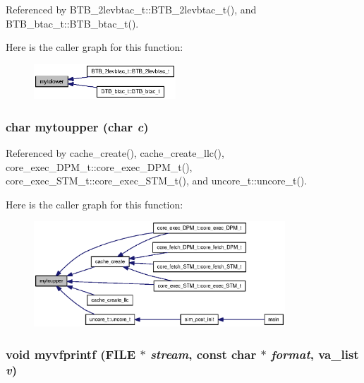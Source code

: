 Referenced by BTB\_\-2levbtac\_\-t::BTB\_\-2levbtac\_\-t(), and BTB\_\-btac\_\-t::BTB\_\-btac\_\-t().

Here is the caller graph for this function:\nopagebreak
\begin{figure}[H]
\begin{center}
\leavevmode
\includegraphics[width=151pt]{misc_8h_a400d7148b23b4458a7dd87fc590d780_icgraph}
\end{center}
\end{figure}
\subsubsection[{mytoupper}]{\setlength{\rightskip}{0pt plus 5cm}char mytoupper (char {\em c})}\label{misc_8h_e9332e6ace7e2352b856c2a76bd9ef43}




Referenced by cache\_\-create(), cache\_\-create\_\-llc(), core\_\-exec\_\-DPM\_\-t::core\_\-exec\_\-DPM\_\-t(), core\_\-exec\_\-STM\_\-t::core\_\-exec\_\-STM\_\-t(), and uncore\_\-t::uncore\_\-t().

Here is the caller graph for this function:\nopagebreak
\begin{figure}[H]
\begin{center}
\leavevmode
\includegraphics[width=267pt]{misc_8h_e9332e6ace7e2352b856c2a76bd9ef43_icgraph}
\end{center}
\end{figure}
\subsubsection[{myvfprintf}]{\setlength{\rightskip}{0pt plus 5cm}void myvfprintf (FILE $\ast$ {\em stream}, \/  const char $\ast$ {\em format}, \/  va\_\-list {\em v})}\label{misc_8h_aa0d7ecda2812ae947ffbd08324e54ad}


